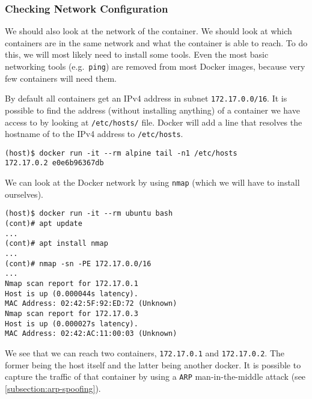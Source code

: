 \subsubsection{Checking Network Configuration}
We should also look at the network of the container. We should look at which containers are in the same network and what the container is able to reach. To do this, we will most likely need to install some tools. Even the most basic networking tools (e.g.\ \lstinline{ping}) are removed from most Docker images, because very few containers will need them.

By default all containers get an IPv4 address in subnet \lstinline{172.17.0.0/16}. It is possible to find the address (without installing anything) of a container we have access to by looking at \lstinline{/etc/hosts/} file. Docker will add a line that resolves the hostname of to the IPv4 address to \lstinline{/etc/hosts}.

\begin{lstlisting}[caption={Last line of \lstinline{/etc/hosts} in Docker.},captionpos=b]
(host)$ docker run -it --rm alpine tail -n1 /etc/hosts
172.17.0.2 e0e6b96367db
\end{lstlisting}


We can look at the Docker network by using \lstinline{nmap} (which we will have to install ourselves).
\begin{lstlisting}[caption={\lstinline{nmap} scan inside container.},captionpos=b]
(host)$ docker run -it --rm ubuntu bash
(cont)# apt update
...
(cont)# apt install nmap
...
(cont)# nmap -sn -PE 172.17.0.0/16
...
Nmap scan report for 172.17.0.1
Host is up (0.000044s latency).
MAC Address: 02:42:5F:92:ED:72 (Unknown)
Nmap scan report for 172.17.0.3
Host is up (0.000027s latency).
MAC Address: 02:42:AC:11:00:03 (Unknown)
\end{lstlisting}

We see that we can reach two containers, \lstinline{172.17.0.1} and \lstinline{172.17.0.2}. The former being the host itself and the latter being another docker. It is possible to capture the traffic of that container by using a \lstinline{ARP} man-in-the-middle attack (see \autoref{subsection:arp-spoofing}).
